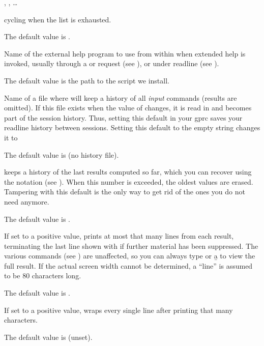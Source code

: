 , ,
  \dots

cycling when the  list is exhausted.

The default value is \kbd{[4,5]}.

\label{se:def,help}
Name of the external help program to use from within  when
extended help is invoked, usually through a  or  request
(see ), or  under readline (see
).

The default value is the path to the  script we install.

\label{se:def,histfile}
Name of a file where
 will keep a history of all \emph{input} commands (results are
omitted). If this file exists when the value of  changes,
it is read in and becomes part of the session history. Thus, setting this
default in your gprc saves your readline history between sessions. Setting
this default to the empty string  changes it to

The default value is  (no history file).

\label{se:def,histsize}
 keeps a history of the last
 results computed so far, which you can recover using the
\kbd{\%} notation (see ). When this number is exceeded,
the oldest values are erased. Tampering with this default is the only way to
get rid of the ones you do not need anymore.

The default value is .

\label{se:def,lines}
If set to a positive value,  prints at
most that many lines from each result, terminating the last line shown with
\kbd{[+++]} if further material has been suppressed. The various 
commands (see ) are unaffected, so you can always type
 or \b{a} to view the full result. If the actual screen width
cannot be determined, a ``line'' is assumed to be 80 characters long.

The default value is .

\label{se:def,linewrap}
If set to a positive value,  wraps every single line after
printing that many characters.

The default value is  (unset).

